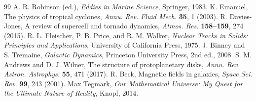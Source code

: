 \documentclass[12pt]{article}
\begin{document}
\begin{thebibliography}{99}
		A. R. Robinson (ed.), \emph{Eddies in Marine Science}, Springer, 1983.
		K. Emanuel, The physics of tropical cyclones, \emph{Annu. Rev. Fluid Mech.} \textbf{35}, 1 (2003).
		R. Davies-Jones, A review of supercell and tornado dynamics, \emph{Atmos. Res.} \textbf{158--159}, 274 (2015).
		R. L. Fleischer, P. B. Price, and R. M. Walker, \emph{Nuclear Tracks in Solids: Principles and Applications}, University of California Press, 1975.
		J. Binney and S. Tremaine, \emph{Galactic Dynamics}, Princeton University Press, 2nd ed., 2008.
		S. M. Andrews and D. J. Wilner, The structure of protoplanetary disks, \emph{Annu. Rev. Astron. Astrophys.} \textbf{55}, 471 (2017).
		R. Beck, Magnetic fields in galaxies, \emph{Space Sci. Rev.} \textbf{99}, 243 (2001).
		Max Tegmark, \emph{Our Mathematical Universe: My Quest for the Ultimate Nature of Reality}, Knopf, 2014.
	\end{thebibliography}
	
\end{document}
